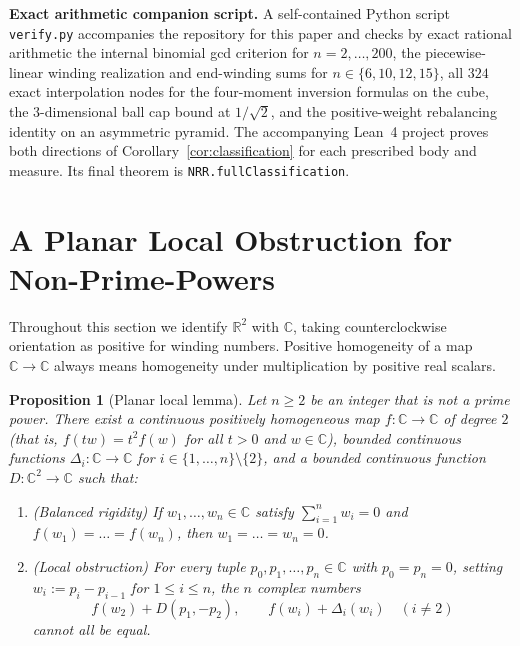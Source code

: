 \documentclass[11pt,a4paper]{amsart}
\numberwithin{equation}{section}
\newtheorem{proposition}[theorem]{Proposition}
\theoremstyle{definition}
\newcommand{\R}{\mathbb{R}}
\newcommand{\C}{\mathbb{C}}
\begin{document}
\medskip
\noindent\textbf{Exact arithmetic companion script.}
A self-contained Python script \texttt{verify.py} accompanies the repository for this paper and checks by exact rational arithmetic the internal binomial gcd criterion for $n = 2, \dots, 200$, the piecewise-linear winding realization and end-winding sums for $n \in \{6, 10, 12, 15\}$, all $324$ exact interpolation nodes for the four-moment inversion formulas on the cube, the $3$-dimensional ball cap bound at $1/\sqrt{2}$, and the positive-weight rebalancing identity on an asymmetric pyramid. The accompanying Lean~4 project proves both directions of Corollary~\ref{cor:classification} for each prescribed body and measure. Its final theorem is \texttt{NRR.fullClassification}.

\section{A Planar Local Obstruction for Non-Prime-Powers}
\label{sec:planar}

Throughout this section we identify $\R^2$ with $\C$, taking counterclockwise orientation as positive for winding numbers. Positive homogeneity of a map $\C \to \C$ always means homogeneity under multiplication by positive real scalars.

\begin{proposition}[Planar local lemma]
\label{prop:local-lemma}
Let $n \ge 2$ be an integer that is not a prime power. There exist a continuous positively homogeneous map $f : \C \to \C$ of degree $2$ (that is, $f(t w) = t^2 f(w)$ for all $t > 0$ and $w \in \C$), bounded continuous functions $\Delta_i : \C \to \C$ for $i \in \{1,\dots,n\} \setminus \{2\}$, and a bounded continuous function $D : \C^2 \to \C$ such that:
\begin{enumerate}[label=\textup{(\roman*)}]
\item \emph{(Balanced rigidity)} If $w_1, \dots, w_n \in \C$ satisfy $\sum_{i=1}^n w_i = 0$ and $f(w_1) = \dots = f(w_n)$, then $w_1 = \dots = w_n = 0$.
\item \emph{(Local obstruction)} For every tuple $p_0, p_1, \dots, p_n \in \C$ with $p_0 = p_n = 0$, setting $w_i := p_i - p_{i-1}$ for $1 \le i \le n$, the $n$ complex numbers
\[
f(w_2) + D(p_1, -p_2), \qquad f(w_i) + \Delta_i(w_i) \quad (i \ne 2)
\]
cannot all be equal.
\end{enumerate}
\end{proposition}
\end{document}
